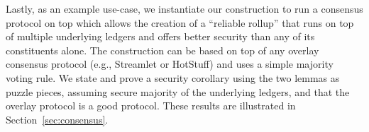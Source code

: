 Lastly, as an example use-case, we instantiate our \rollerblade construction
to run a consensus protocol on top which allows the creation of a ``reliable
rollup'' that runs on top of multiple underlying ledgers and offers better security
than any of its constituents alone. The construction can be based on top of any
overlay consensus protocol (e.g., Streamlet or HotStuff) and uses a simple
majority voting rule.  We state and prove a security corollary
using the two lemmas as puzzle pieces, assuming secure majority of the underlying
ledgers, and that the overlay protocol is a good protocol. These results
are illustrated in Section~\ref{sec:consensus}.


%
%
